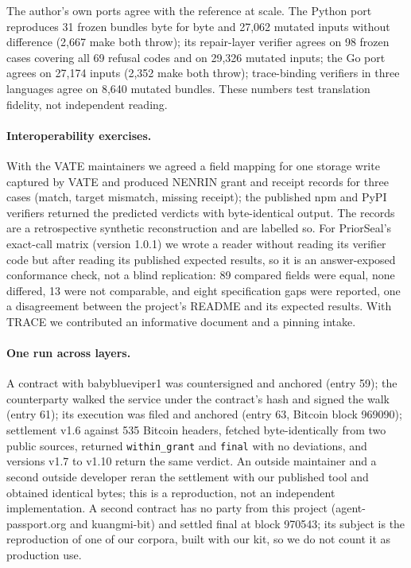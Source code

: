 \documentclass[11pt,a4paper]{article}
\newcommand{\code}[1]{\texttt{#1}}
\begin{document}
The author's own ports agree with the reference at scale. The Python port reproduces 31 frozen bundles byte for byte and 27,062 mutated inputs without difference (2,667 make both throw); its repair-layer verifier agrees on 98 frozen cases covering all 69 refusal codes and on 29,326 mutated inputs; the Go port agrees on 27,174 inputs (2,352 make both throw); trace-binding verifiers in three languages agree on 8,640 mutated bundles. These numbers test translation fidelity, not independent reading.

\paragraph{Interoperability exercises.} With the VATE maintainers we agreed a field mapping for one storage write captured by VATE and produced NENRIN grant and receipt records for three cases (match, target mismatch, missing receipt); the published npm and PyPI verifiers returned the predicted verdicts with byte-identical output. The records are a retrospective synthetic reconstruction and are labelled so. For PriorSeal's exact-call matrix (version 1.0.1) we wrote a reader without reading its verifier code but after reading its published expected results, so it is an answer-exposed conformance check, not a blind replication: 89 compared fields were equal, none differed, 13 were not comparable, and eight specification gaps were reported, one a disagreement between the project's README and its expected results. With TRACE we contributed an informative document and a pinning intake.

\paragraph{One run across layers.} A contract with babyblueviper1 was countersigned and anchored (entry 59); the counterparty walked the service under the contract's hash and signed the walk (entry 61); its execution was filed and anchored (entry 63, Bitcoin block 969090); settlement v1.6 against 535 Bitcoin headers, fetched byte-identically from two public sources, returned \code{within\_grant} and \code{final} with no deviations, and versions v1.7 to v1.10 return the same verdict. An outside maintainer and a second outside developer reran the settlement with our published tool and obtained identical bytes; this is a reproduction, not an independent implementation. A second contract has no party from this project (agent-passport.org and kuangmi-bit) and settled final at block 970543; its subject is the reproduction of one of our corpora, built with our kit, so we do not count it as production use.
\end{document}

